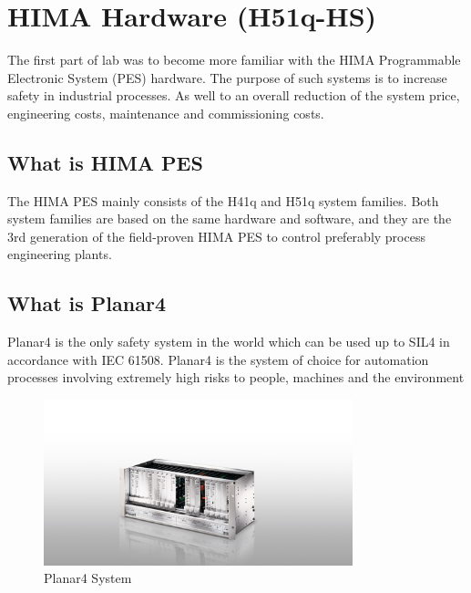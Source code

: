 \section{HIMA Hardware (H51q-HS)}
The first part of lab was to become more familiar with the HIMA 
Programmable Electronic System (PES) hardware. The purpose of such systems is to increase safety in industrial processes. As well to an overall reduction of the system price, engineering costs, maintenance and commissioning costs. 



\subsection{What is HIMA PES}
The HIMA PES mainly consists of the H41q and H51q system families.
Both system families are based on the same hardware and software, and
they are the 3rd generation of the field-proven HIMA PES to control preferably process engineering plants.

\subsection{What is Planar4} 
Planar4 is the only safety system in the world which can be used up to SIL4 in accordance with IEC 61508. Planar4 is the system of choice for automation processes involving extremely high risks to people, machines and the environment 


\begin{figure}[!htb]
    \centering
    \includegraphics[width=0.8\textwidth]{images/Planar4}
     \caption{Planar4 System}
\end{figure}


